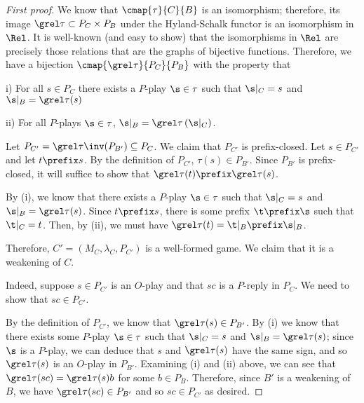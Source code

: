 \documentclass[11pt]{article} %
\begin{document}
\begin{proof}[First proof]
  We know that $\cmap{\tau}{C}{B}$ is an isomorphism; therefore, its image $\grel\tau\subset P_C\times P_B$ under the Hyland-Schalk functor is an isomorphism in $\Rel$.  It is well-known (and easy to show) that the isomorphisms in $\Rel$ are precisely those relations that are the graphs of bijective functions.  Therefore, we have a bijection $\cmap{\grel\tau}{P_C}{P_B}$ with the property that

  i) For all $s\in P_C$ there exists a $P$-play $\s\in\tau$ such that $\s\vert_C=s$ and $\s\vert_B=\grel\tau(s)$

  ii) For all $P$-plays $\s\in\tau$, $\s\vert_B=\grel\tau\left(\s\vert_C\right)$.

  Let $P_{C'}=\grel\tau\inv(P_{B'})\subseteq P_C$.  We claim that $P_{C'}$ is prefix-closed.  Let $s\in P_{C'}$ and let $t\prefix s$.  By the definition of $P_{C'}$, $\tau(s)\in P_{B'}$.  Since $P_{B'}$ is prefix-closed, it will suffice to show that $\grel\tau(t)\prefix\grel\tau(s)$.

  By (i), we know that there exists a $P$-play $\s\in\tau$ such that $\s\vert_C = s$ and $\s\vert_B = \grel\tau(s)$.  Since $t\prefix s$, there is some prefix $\t\prefix\s$ such that $\t\vert_C = t$.  Then, by (ii), we must have $\grel\tau(t)=\t\vert_B\prefix\s\vert_B$.

  Therefore, $C'=(M_C,\lambda_C, P_{C'})$ is a well-formed game.  We claim that it is a weakening of $C$.  

  Indeed, suppose $s\in P_{C'}$ is an $O$-play and that $sc$ is a $P$-reply in $P_C$.  We need to show that $sc\in P_{C'}$.  

  By the definition of $P_{C'}$, we know that $\grel\tau(s)\in P_{B'}$.  By (i) we know that there exists some $P$-play $\s\in\tau$ such that $\s\vert_C=s$ and $\s\vert_B=\grel\tau(s)$; since $\s$ is a $P$-play, we can deduce that $s$ and $\grel\tau(s)$ have the same sign, and so $\grel\tau(s)$ is an $O$-play in $P_{B'}$.  Examining (i) and (ii) above, we can see that $\grel\tau(sc)=\grel\tau(s)b$ for some $b\in P_B$.  Therefore, since $B'$ is a weakening of $B$, we have $\grel\tau(sc)\in P_{B'}$ and so $sc\in P_{C'}$ as desired.


\end{proof}
\end{document}
